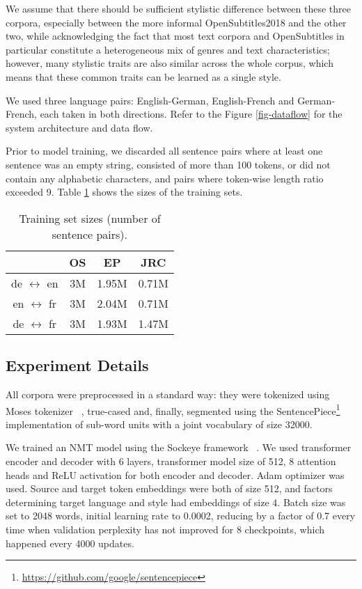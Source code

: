 \documentclass[11pt,a4paper]{article}
\begin{document}
We assume that there should be sufficient stylistic difference between these three corpora, especially between the more informal OpenSubtitles2018 and the other two, while acknowledging the fact that most text corpora and OpenSubtitles in particular constitute a heterogeneous mix of genres and text characteristics; however, many stylistic traits are also similar across the whole corpus, which means that these common traits can be learned as a single style.

We used three language pairs: English-German, English-French and German-French, each taken in both directions. Refer to the Figure \ref{fig-dataflow} for the system architecture and data flow.





Prior to model training, we discarded all sentence pairs where at least one sentence  was an empty string, consisted of more than 100 tokens, or did not contain any alphabetic characters, and pairs where token-wise length ratio exceeded 9. Table \ref{tab-trainsizes} shows the sizes of the training sets.

\begin{table}[]
\centering
\begin{tabular}{|c|c|c|c|}
\hline
                                     & OS & EP    & JRC   \\ \hline
de $\leftrightarrow$ en & 3M & 1.95M & 0.71M \\ \hline
en $\leftrightarrow$ fr & 3M & 2.04M & 0.71M \\ \hline
de $\leftrightarrow$ fr & 3M & 1.93M & 1.47M \\ \hline
\end{tabular}
\caption{\small Training set sizes (number of sentence pairs).
      }
      \label{tab-trainsizes}
\end{table}


\subsection{Experiment Details}

All corpora were preprocessed in a standard way: they were tokenized using Moses tokenizer ~\citep{moses}, true-cased and, finally, segmented using the SentencePiece\footnote{\url{https://github.com/google/sentencepiece}} \citep{googleSentencePieces}
implementation of sub-word units with a joint vocabulary of size 32000.

We trained an NMT model using the Sockeye framework ~\citep{sockeye}. We used transformer encoder and decoder with 6 layers, transformer model size of 512, 8 attention heads and ReLU activation for both encoder and decoder. Adam optimizer was used. Source and target token embeddings were both of size 512, and factors determining target language and style had embeddings of size 4. Batch size was set to 2048 words, initial learning rate to 0.0002, reducing by a factor of 0.7 every time when validation perplexity has not improved for 8 checkpoints, which happened every 4000 updates.
\end{document}
